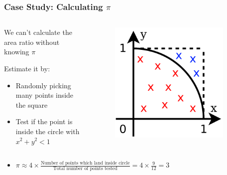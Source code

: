 \documentclass[14pt]{beamer}
\begin{document}
\begin{frame}
\frametitle{Case Study: Calculating $\pi$}
\begin{columns}
\begin{column}{0.6\textwidth}
\begin{itemize}
\small{
\item We can't calculate the area ratio without knowing $\pi$
\item Estimate it by:
\begin{itemize}
	\item Randomly picking many points inside the square
	\item Test if the point is inside the circle with $x^2 + y^2 < 1$
	\end{itemize}
}
\end{itemize}
\end{column}
\begin{column}{0.4\textwidth}
\begin{figure}
\includegraphics[width=0.9\textwidth]{pi-dots.png}
\end{figure}
\end{column}
\end{columns}
\begin{itemize}
\item $\pi \approx 4 \times \frac{\textrm{Number of points which land inside circle}}{\textrm{Total number of points tested}} = 4 \times \frac{9}{12} = 3$
\end{itemize}
\end{frame}
\end{document}
